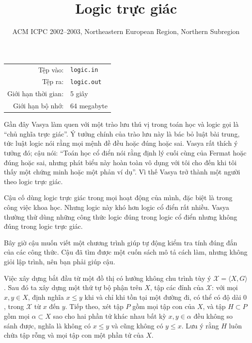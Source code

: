 \documentclass[11pt]{article}
\title{Logic trực giác}
\author{ACM ICPC 2002--2003, Northeastern European Region, Northern Subregion}
\date{}
\begin{document}
\maketitle


\begin{center}
\begin{tabular}{rl}
Tệp vào: & \texttt{logic.in}\\
Tệp ra: & \texttt{logic.out}\\
Giới hạn thời gian: & 5 giây\\
Giới hạn bộ nhớ: & 64 megabyte
\end{tabular}
\end{center}

Gần đây Vasya làm quen với một trào lưu thú vị trong toán học và logic gọi là
``chủ nghĩa trực giác''. Ý tưởng chính của trào lưu này là bác bỏ luật bài
trung, tức luật logic nói rằng mọi mệnh đề đều hoặc đúng hoặc sai. Vasya rất
thích ý tưởng đó; cậu nói: ``Toán học cổ điển nói rằng định lý cuối cùng của
Fermat hoặc đúng hoặc sai, nhưng phát biểu này hoàn toàn vô dụng với tôi cho
đến khi tôi thấy một chứng minh hoặc một phản ví dụ''. Vì thế Vasya trở thành
một người theo logic trực giác.

Cậu cố dùng logic trực giác trong mọi hoạt động của mình, đặc biệt là trong
công việc khoa học. Nhưng logic này khó hơn logic cổ điển rất nhiều. Vasya
thường thử dùng những công thức logic đúng trong logic cổ điển nhưng không
đúng trong logic trực giác.

Bây giờ cậu muốn viết một chương trình giúp tự động kiểm tra tính đúng đắn của
các công thức. Cậu đã tìm được một cuốn sách mô tả cách làm, nhưng không giỏi
lập trình, nên bạn phải giúp cậu.

Việc xây dựng bắt đầu từ một đồ thị có hướng không chu trình tùy ý
\(\mathcal X=\langle X,G\rangle\). Sau đó ta xây dựng một thứ tự bộ phận trên
\(X\), tập các đỉnh của \(\mathcal X\): với mọi \(x,y\in X\), định nghĩa
\(x\le y\) khi và chỉ khi tồn tại một đường đi, có thể có độ dài \(0\), trong
\(\mathcal X\) từ \(x\) đến \(y\). Tiếp theo, xét tập \(P\) gồm mọi tập con của
\(X\), và tập \(H\subset P\) gồm mọi \(\alpha\subset X\) sao cho hai phần tử
khác nhau bất kỳ \(x,y\in\alpha\) đều không so sánh được, nghĩa là không có
\(x\le y\) và cũng không có \(y\le x\). Lưu ý rằng \(H\) luôn chứa tập rỗng và
mọi tập con một phần tử của \(X\).
\end{document}
